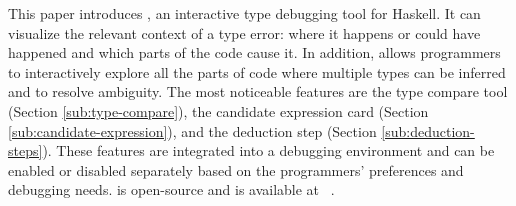 This paper introduces \chameleon{}, an interactive type debugging tool for Haskell. It can visualize the relevant context of a type error: where it happens or could have happened and which parts of the code cause it. In addition, \chameleon{} allows programmers to interactively explore all the parts of code where multiple types can be inferred and to resolve ambiguity. The most noticeable features are the type compare tool (Section \ref{sub:type-compare}), the candidate expression card (Section \ref{sub:candidate-expression}), and the deduction step (Section \ref{sub:deduction-steps}). These features are integrated into a debugging environment and can be enabled or disabled separately based on the programmers' preferences and debugging needs. \chameleon{} is open-source and is available at ~\cite{Fu2022-xp}.  




